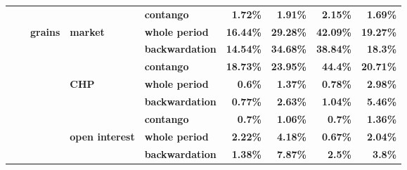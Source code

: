 \documentclass[
  authoryear,
  preprint,
  3p]{elsarticle}
\begin{document}
\begin{longtable}[t]{>{}l>{}l>{}l>{}l>{}l>{}r>{}r>{}r>{}r}
\addlinespace
\textbf{} & \textbf{} & \textbf{} & \textbf{} & \textbf{contango} & \textcolor[HTML]{4285f4}{\textbf{1.72\%}} & \textcolor[HTML]{4285f4}{\textbf{1.91\%}} & \textcolor[HTML]{4285f4}{\textbf{2.15\%}} & \textcolor[HTML]{4285f4}{\textbf{1.69\%}}\\
\textbf{} & \textbf{} & \textbf{grains} & \textbf{market} & \textbf{whole period} & \textcolor[HTML]{4285f4}{\textbf{16.44\%}} & \textcolor[HTML]{4285f4}{\textbf{29.28\%}} & \textcolor[HTML]{4285f4}{\textbf{42.09\%}} & \textcolor[HTML]{4285f4}{\textbf{19.27\%}}\\
\textbf{} & \textbf{} & \textbf{} & \textbf{} & \textbf{backwardation} & \textcolor[HTML]{4285f4}{\textbf{14.54\%}} & \textcolor[HTML]{4285f4}{\textbf{34.68\%}} & \textcolor[HTML]{4285f4}{\textbf{38.84\%}} & \textcolor[HTML]{4285f4}{\textbf{18.3\%}}\\
\textbf{} & \textbf{} & \textbf{} & \textbf{} & \textbf{contango} & \textcolor[HTML]{4285f4}{\textbf{18.73\%}} & \textcolor[HTML]{4285f4}{\textbf{23.95\%}} & \textcolor[HTML]{4285f4}{\textbf{44.4\%}} & \textcolor[HTML]{4285f4}{\textbf{20.71\%}}\\
\textbf{} & \textbf{} & \textbf{} & \textbf{CHP} & \textbf{whole period} & \textcolor[HTML]{4285f4}{\textbf{0.6\%}} & \textcolor[HTML]{4285f4}{\textbf{1.37\%}} & \textcolor[HTML]{4285f4}{\textbf{0.78\%}} & \textcolor[HTML]{4285f4}{\textbf{2.98\%}}\\
\addlinespace
\textbf{} & \textbf{} & \textbf{} & \textbf{} & \textbf{backwardation} & \textcolor[HTML]{4285f4}{\textbf{0.77\%}} & \textcolor[HTML]{4285f4}{\textbf{2.63\%}} & \textcolor[HTML]{4285f4}{\textbf{1.04\%}} & \textcolor[HTML]{4285f4}{\textbf{5.46\%}}\\
\textbf{} & \textbf{} & \textbf{} & \textbf{} & \textbf{contango} & \textcolor[HTML]{4285f4}{\textbf{0.7\%}} & \textcolor[HTML]{4285f4}{\textbf{1.06\%}} & \textcolor[HTML]{4285f4}{\textbf{0.7\%}} & \textcolor[HTML]{4285f4}{\textbf{1.36\%}}\\
\textbf{} & \textbf{} & \textbf{} & \textbf{open interest} & \textbf{whole period} & \textcolor[HTML]{4285f4}{\textbf{2.22\%}} & \textcolor[HTML]{4285f4}{\textbf{4.18\%}} & \textcolor[HTML]{4285f4}{\textbf{0.67\%}} & \textcolor[HTML]{4285f4}{\textbf{2.04\%}}\\
\textbf{} & \textbf{} & \textbf{} & \textbf{} & \textbf{backwardation} & \textcolor[HTML]{4285f4}{\textbf{1.38\%}} & \textcolor[HTML]{4285f4}{\textbf{7.87\%}} & \textcolor[HTML]{4285f4}{\textbf{2.5\%}} & \textcolor[HTML]{4285f4}{\textbf{3.8\%}}\\

\end{longtable}
\end{document}
